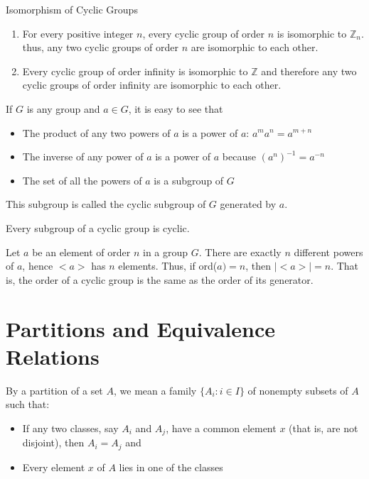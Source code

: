 \documentclass[12pt]{article}
\newcommand{\pinverse}[1]{(#1)^{-1}}
\newcommand{\set}[1]{\{ #1 \}}
\newcommand{\integers}{\mathds{Z}}
\begin{document}
\begin{theorem} Isomorphism of Cyclic Groups \begin{enumerate} 
\item For every positive integer $n$, every cyclic group of order $n$ is isomorphic to $\integers_n$. thus, any two cyclic groups of order $n$ are isomorphic to each other. 
\item Every cyclic group of order infinity is isomorphic to $\integers$ and therefore any two cyclic groups of order infinity are isomorphic to each other. \end{enumerate} \end{theorem} 

If $G$ is any group and $a \in G$, it is easy to see that \begin{itemize} 
\item The product of any two powers of $a$ is a power of $a$: $a^ma^n = a^{m + n}$
\item The inverse of any power of $a$ is a power of $a$ because $\pinverse{a^n} = a^{-n}$ 
\item The set of all the powers of $a$ is a subgroup of $G$ \end{itemize} 
This subgroup is called the cyclic subgroup of $G$ generated by $a$. 

\begin{theorem} Every subgroup of a cyclic group is cyclic. \end{theorem} 

\begin{definition} Let $a$ be an element of order $n$ in a group $G$. There are exactly $n$ different powers of $a$, hence $<a>$ has $n$ elements. Thus, if ord($a) = n$, then $|<a>| = n$. That is, the order of a cyclic group is the same as the order of its generator. \end{definition} 

\section{Partitions and Equivalence Relations} 

\begin{definition} By a partition of a set $A$, we mean a family $\set{A_i: i \in I}$ of nonempty subsets of $A$ such that: \begin{itemize} 
\item If any two classes, say $A_i$ and $A_j$, have a common element $x$ (that is, are not disjoint), then $A_i = A_j$ and 
\item Every element $x$ of $A$ lies in one of the classes \end{itemize}  \end{definition} 
\end{document}
